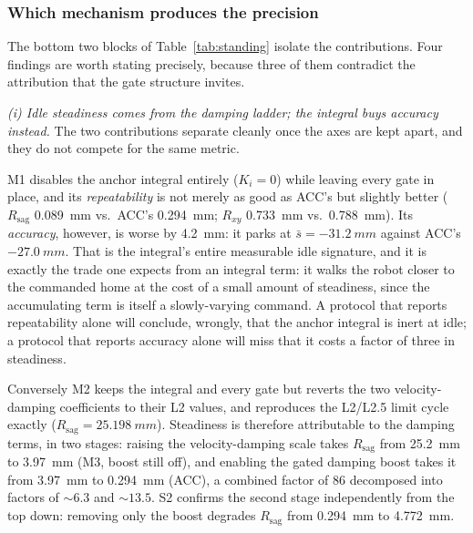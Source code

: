 \documentclass[conference]{IEEEtran}
\begin{document}
\subsubsection{Which mechanism produces the precision}
\label{sec:idle_mechanism}

The bottom two blocks of Table~\ref{tab:standing} isolate the contributions. Four
findings are worth stating precisely, because three of them contradict the
attribution that the gate structure invites.

\emph{(i) Idle steadiness comes from the damping ladder; the integral buys
accuracy instead.} The two contributions separate cleanly once the axes are kept
apart, and they do not compete for the same metric.

M1 disables the anchor integral entirely ($K_i{=}0$) while leaving every gate in
place, and its \emph{repeatability} is not merely as good as ACC's but slightly
better ($R_{\text{sag}}$ \SI{0.089}{mm} vs.\ ACC's \SI{0.294}{mm};
$R_{xy}$ \SI{0.733}{mm} vs.\ \SI{0.788}{mm}). Its \emph{accuracy}, however, is
worse by \SI{4.2}{mm}: it parks at $\bar{s}={-}\SI{31.2}{mm}$ against ACC's
$-\SI{27.0}{mm}$. That is the integral's entire measurable idle signature, and it
is exactly the trade one expects from an integral term: it walks the robot closer to the commanded home at the cost of a small amount of steadiness, since
the accumulating term is itself a slowly-varying command. A protocol that reports
repeatability alone will conclude, wrongly, that the anchor integral is inert at
idle; a protocol that reports accuracy alone will miss that it costs a factor of
three in steadiness.

Conversely M2 keeps the integral and every gate but reverts the two
velocity-damping coefficients to their L2 values, and reproduces the L2/L2.5 limit
cycle exactly ($R_{\text{sag}}=\SI{25.198}{mm}$). Steadiness is therefore
attributable to the damping terms, in two stages: raising the velocity-damping
scale takes $R_{\text{sag}}$ from \SI{25.2}{mm} to \SI{3.97}{mm} (M3, boost still
off), and enabling the gated damping boost takes it from \SI{3.97}{mm} to
\SI{0.294}{mm} (ACC), a combined factor of \num{86} decomposed into factors of
${\sim}\num{6.3}$ and ${\sim}\num{13.5}$. S2 confirms the second stage
independently from the top down: removing only the boost degrades
$R_{\text{sag}}$ from \SI{0.294}{mm} to \SI{4.772}{mm}.
\end{document}
